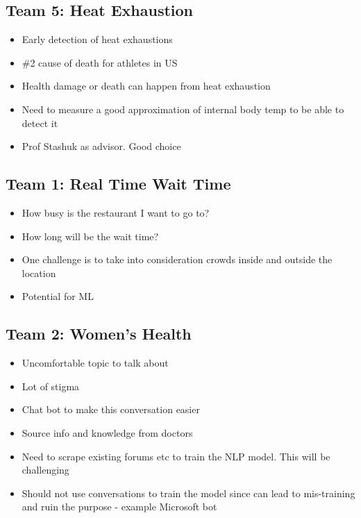     		    \subsection{Team 5: Heat Exhaustion}
    \begin{itemize}
    		\item Early detection of heat exhaustions
    		\item \#2 cause of death for athletes in US
    		\item Health damage or death can happen from heat exhaustion
    		\item Need to measure a good approximation of internal body temp to be able to detect it
    		\item Prof Stashuk as advisor. Good choice
    \end{itemize}
    
        \subsection{Team 1: Real Time Wait Time}
    \begin{itemize}
    		\item How busy is the restaurant I want to go to?
    		\item How long will be the wait time?
    		\item One challenge is to take into consideration crowds inside and outside the location
    		\item Potential for ML
    \end{itemize}
    
        \subsection{Team 2: Women's Health}
    \begin{itemize}
    		\item Uncomfortable topic to talk about
    		\item Lot of stigma
    		\item Chat bot to make this conversation easier
    		\item Source info and knowledge from doctors
    		\item Need to scrape existing forums etc to train the NLP model. This will be challenging
    		\item Should not use conversations to train the model since can lead to mis-training and ruin the purpose - example Microsoft bot
    \end{itemize}
    
